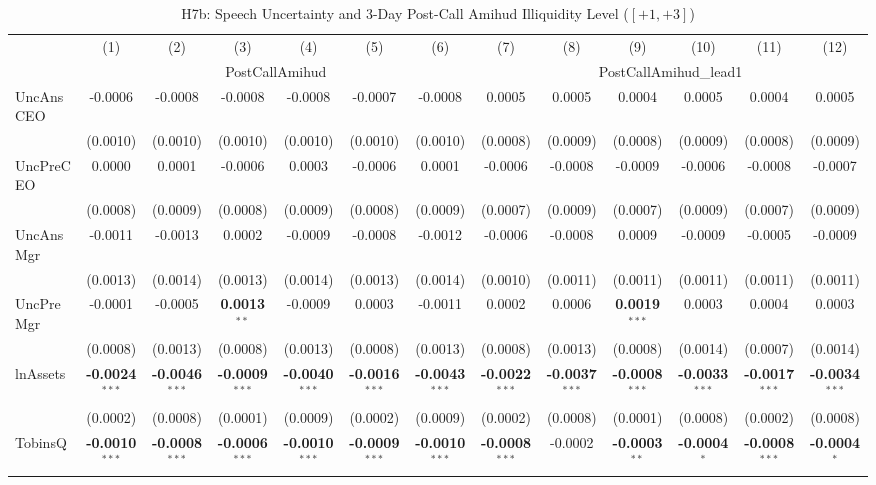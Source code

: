 \documentclass[11pt,a4paper]{article}
\begin{document}
\clearpage
\begin{table}[htbp]
\centering
\caption{H7b: Speech Uncertainty and 3-Day Post-Call Amihud Illiquidity Level ($[+1,+3]$)}
\label{tab:h7b}
\scriptsize
\begin{tabular}{lcccccccccccc}
\toprule
 & (1) & (2) & (3) & (4) & (5) & (6) & (7) & (8) & (9) & (10) & (11) & (12) \\
 & \multicolumn{6}{c}{PostCallAmihud} & \multicolumn{6}{c}{PostCallAmihud\_lead1} \\
\cmidrule(lr){2-7} \cmidrule(lr){8-13}
\midrule
UncAnsCEO & -0.0006 & -0.0008 & -0.0008 & -0.0008 & -0.0007 & -0.0008 & 0.0005 & 0.0005 & 0.0004 & 0.0005 & 0.0004 & 0.0005 \\
 & (0.0010) & (0.0010) & (0.0010) & (0.0010) & (0.0010) & (0.0010) & (0.0008) & (0.0009) & (0.0008) & (0.0009) & (0.0008) & (0.0009) \\
UncPreCEO & 0.0000 & 0.0001 & -0.0006 & 0.0003 & -0.0006 & 0.0001 & -0.0006 & -0.0008 & -0.0009 & -0.0006 & -0.0008 & -0.0007 \\
 & (0.0008) & (0.0009) & (0.0008) & (0.0009) & (0.0008) & (0.0009) & (0.0007) & (0.0009) & (0.0007) & (0.0009) & (0.0007) & (0.0009) \\
UncAnsMgr & -0.0011 & -0.0013 & 0.0002 & -0.0009 & -0.0008 & -0.0012 & -0.0006 & -0.0008 & 0.0009 & -0.0009 & -0.0005 & -0.0009 \\
 & (0.0013) & (0.0014) & (0.0013) & (0.0014) & (0.0013) & (0.0014) & (0.0010) & (0.0011) & (0.0011) & (0.0011) & (0.0011) & (0.0011) \\
UncPreMgr & -0.0001 & -0.0005 & \textbf{0.0013}$^{**}$ & -0.0009 & 0.0003 & -0.0011 & 0.0002 & 0.0006 & \textbf{0.0019}$^{***}$ & 0.0003 & 0.0004 & 0.0003 \\
 & (0.0008) & (0.0013) & (0.0008) & (0.0013) & (0.0008) & (0.0013) & (0.0008) & (0.0013) & (0.0008) & (0.0014) & (0.0007) & (0.0014) \\
\midrule
lnAssets & \textbf{-0.0024}$^{***}$ & \textbf{-0.0046}$^{***}$ & \textbf{-0.0009}$^{***}$ & \textbf{-0.0040}$^{***}$ & \textbf{-0.0016}$^{***}$ & \textbf{-0.0043}$^{***}$ & \textbf{-0.0022}$^{***}$ & \textbf{-0.0037}$^{***}$ & \textbf{-0.0008}$^{***}$ & \textbf{-0.0033}$^{***}$ & \textbf{-0.0017}$^{***}$ & \textbf{-0.0034}$^{***}$ \\
 & (0.0002) & (0.0008) & (0.0001) & (0.0009) & (0.0002) & (0.0009) & (0.0002) & (0.0008) & (0.0001) & (0.0008) & (0.0002) & (0.0008) \\
TobinsQ & \textbf{-0.0010}$^{***}$ & \textbf{-0.0008}$^{***}$ & \textbf{-0.0006}$^{***}$ & \textbf{-0.0010}$^{***}$ & \textbf{-0.0009}$^{***}$ & \textbf{-0.0010}$^{***}$ & \textbf{-0.0008}$^{***}$ & -0.0002 & \textbf{-0.0003}$^{**}$ & \textbf{-0.0004}$^{*}$ & \textbf{-0.0008}$^{***}$ & \textbf{-0.0004}$^{*}$ \\

\end{tabular}
\end{table}
\end{document}
